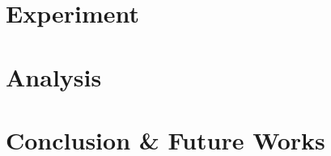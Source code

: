 \documentclass[conference]{configs/IEEEtran}
\begin{document}
\section{Experiment}

\section{Analysis}

\section{Conclusion \& Future Works}

%




\vspace{12pt}
\end{document}
